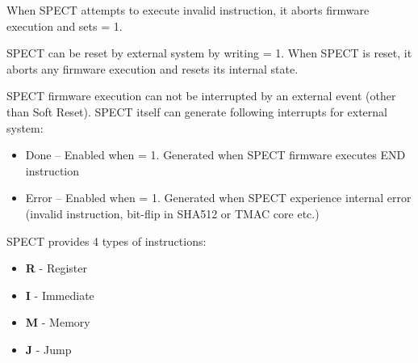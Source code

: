 \documentclass{tropic_design_spec}
\begin{document}

When SPECT attempts to execute invalid instruction, it aborts firmware execution
and sets  = 1.



SPECT can be reset by external system by writing  = 1.
When SPECT is reset, it aborts any firmware execution and resets its internal state.



SPECT firmware execution can not be interrupted by an external event (other than
Soft Reset). SPECT itself can generate following interrupts for external system:
\begin{itemize}
    \item{Done -- Enabled when  = 1.
                  Generated when SPECT firmware executes END instruction}
    \item{Error -- Enabled when  = 1.
                   Generated when SPECT experience internal error (invalid instruction, bit-flip in SHA512 or TMAC core etc.)}
\end{itemize}




SPECT provides 4 types of instructions:
\begin{itemize}
    \item{\textbf{R} - Register}
    \item{\textbf{I} - Immediate}
    \item{\textbf{M} - Memory}
    \item{\textbf{J} - Jump}
\end{itemize}

\end{document}
